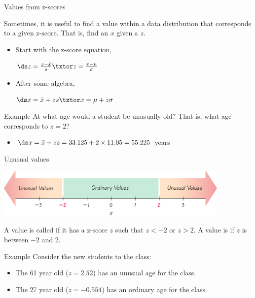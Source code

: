 \documentclass[xcolor=table, handout]{beamer}
\begin{document}
\begin{frame}{Values from z-scores}
\begin{block}{}
\large
Sometimes, it is useful to find a value within a data distribution that corresponds to a given z-score. That is, find an $x$ given a $z$. 
\medskip
\begin{itemize}
\pause\item Start with the z-score equation, \\
\smallskip
{\centering $\ds z = \frac{x - \bar x}{s} \txtor z = \frac{x - \mu}{\sigma}$ \par}
\pause\item After some algebra,\\
\smallskip
{\centering $\ds x = \bar x + z s \txtor x = \mu + z \sigma$ \par}
\end{itemize}
\end{block}

\pause
\begin{exampleblock}{Example}
At what age would a student be unusually old? That is, what age corresponds to $z=2$?\\
\medskip
\begin{itemize}
\pause\item $\ds x = \bar x + z s = 33.125 + 2 \times 11.05 =  55.225$ years
\end{itemize}
\end{exampleblock}
\end{frame}

\begin{frame}{Unusual values}

{\centering
\includegraphics[width=4.5in]{../images/ch03_unusual} \par
}

\begin{block}{}
\large
A value is called  if it has a z-score $z$ such that $z< -2$ or $z > 2$. A value is  if $z$ is between $-2$ and $2$.
\end{block}

\pause
\begin{exampleblock}{Example}
Consider the new students to the class:
\begin{itemize}
\item The 61 year old ($z=2.52$) has an unusual age for the class. 
\item The 27 year old ($z=-0.554$) has an ordinary age for the class.
\end{itemize}
\end{exampleblock}
\end{frame}
\end{document}
